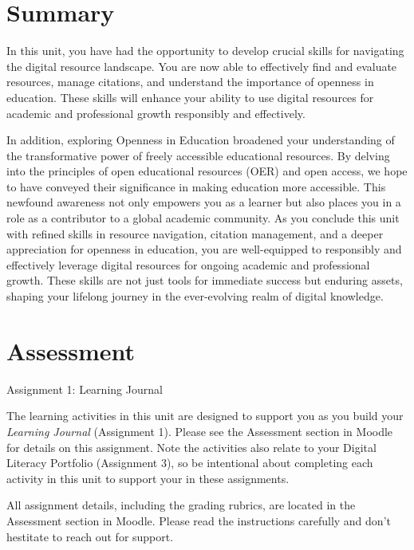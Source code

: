 \documentclass[
]{book}
\theoremstyle{definition}
\theoremstyle{definition}
\theoremstyle{definition}
\theoremstyle{definition}
\theoremstyle{remark}
\begin{document}
\hypertarget{summary-1}{%
\section*{Summary}\label{summary-1}}

In this unit, you have had the opportunity to develop crucial skills for navigating the digital resource landscape. You are now able to effectively find and evaluate resources, manage citations, and understand the importance of openness in education. These skills will enhance your ability to use digital resources for academic and professional growth responsibly and effectively.

In addition, exploring Openness in Education broadened your understanding of the transformative power of freely accessible educational resources. By delving into the principles of open educational resources (OER) and open access, we hope to have conveyed their significance in making education more accessible. This newfound awareness not only empowers you as a learner but also places you in a role as a contributor to a global academic community. As you conclude this unit with refined skills in resource navigation, citation management, and a deeper appreciation for openness in education, you are well-equipped to responsibly and effectively leverage digital resources for ongoing academic and professional growth. These skills are not just tools for immediate success but enduring assets, shaping your lifelong journey in the ever-evolving realm of digital knowledge.

\hypertarget{assessment-1}{%
\section*{Assessment}\label{assessment-1}}

\begin{assessment}
{Assignment 1: Learning Journal}

The learning activities in this unit are designed to support you as you build your \emph{Learning Journal} (Assignment 1). Please see the Assessment section in Moodle for details on this assignment. Note the activities also relate to your Digital Literacy Portfolio (Assignment 3), so be intentional about completing each activity in this unit to support your in these assignments.

All assignment details, including the grading rubrics, are located in the Assessment section in Moodle. Please read the instructions carefully and don't hestitate to reach out for support.
\end{assessment}
\end{document}
